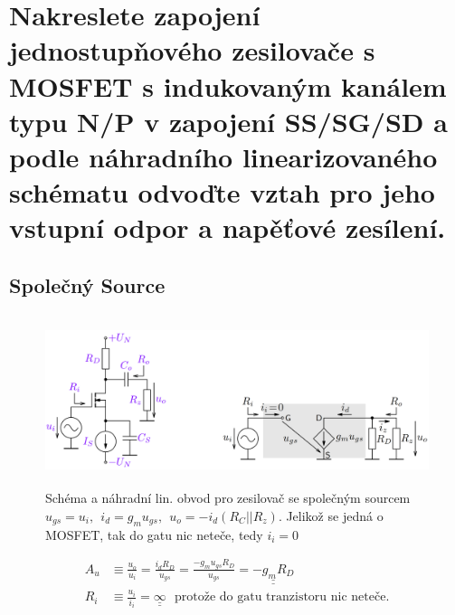 \documentclass[a4paper,12pt]{article}   %
\begin{document}
\section{Nakreslete zapojení jednostupňového zesilovače s MOSFET s indukovaným kanálem typu N/P v zapojení SS/SG/SD a podle náhradního linearizovaného schématu odvoďte vztah pro jeho vstupní odpor a napěťové zesílení.}

\subsection*{Společný Source}
\begin{figure}[h!]
    \centering
    \includegraphics[height=5cm]{NMOS-SS.PNG}
    \caption{Schéma a náhradní lin. obvod pro zesilovač se společným sourcem\\\centering$u_{gs} = u_i,~~i_d = g_mu_{gs},~~u_o = -i_d(R_C||R_z)$. Jelikož se jedná o MOSFET, tak do gatu nic neteče, tedy $i_i=0$}
    \label{fig:zes:ss}
\end{figure}
\begin{align}
    A_u &\equiv \frac{u_o}{u_i} = \frac{i_dR_D}{u_{gs}} = \frac{-g_m u_{gs}R_D}{u_{gs}} = \underline{\underline{-g_mR_D}}\\
    R_i &\equiv \frac{u_i}{i_i} = \underline{\underline{\infty}}\text{~~protože do gatu tranzistoru nic neteče.}
\end{align}
\end{document}

